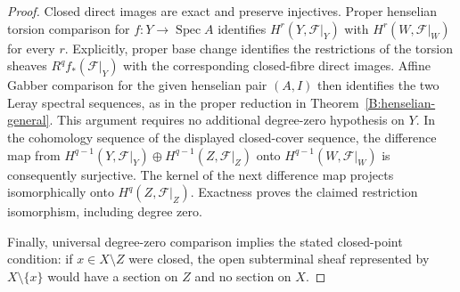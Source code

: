 \begin{proof}
Closed direct images are exact and preserve injectives.
Proper henselian torsion comparison for
$f:Y\to\operatorname{Spec}A$ identifies
$H^r(Y,\mathcal F|_Y)$ with $H^r(W,\mathcal F|_W)$ for every $r$.
Explicitly, proper base change identifies the restrictions of
the torsion sheaves $R^qf_*(\mathcal F|_Y)$ with the corresponding
closed-fibre direct images. Affine Gabber comparison for the
given henselian pair $(A,I)$ then identifies the two Leray
spectral sequences, as in the proper reduction in
Theorem~\ref{B:henselian-general}. This argument requires no
additional degree-zero hypothesis on $Y$.
In the cohomology sequence of the displayed closed-cover sequence,
the difference map from
$H^{q-1}(Y,\mathcal F|_Y)\oplus H^{q-1}(Z,\mathcal F|_Z)$
onto $H^{q-1}(W,\mathcal F|_W)$ is consequently surjective.
The kernel of the next difference map projects isomorphically
onto $H^q(Z,\mathcal F|_Z)$. Exactness proves the claimed
restriction isomorphism, including degree zero.

Finally, universal degree-zero comparison implies the stated
closed-point condition: if $x\in X\setminus Z$ were closed,
the open subterminal sheaf represented by $X\setminus\{x\}$
would have a section on $Z$ and no section on $X$.
\end{proof}

